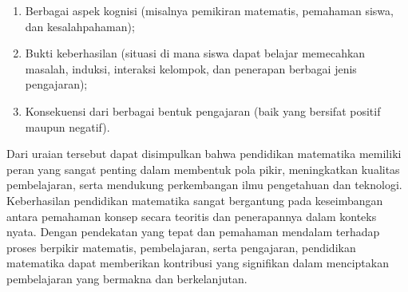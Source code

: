 \documentclass[12pt]{article}
\begin{document}
\begin{enumerate}
\begin{enumerate}
        \item Berbagai aspek kognisi (misalnya pemikiran matematis, pemahaman siswa, dan kesalahpahaman);
        \item Bukti keberhasilan (situasi di mana siswa dapat belajar memecahkan masalah, induksi, interaksi kelompok, dan penerapan berbagai jenis pengajaran);
        \item Konsekuensi dari berbagai bentuk pengajaran (baik yang bersifat positif maupun negatif).
    \end{enumerate}
    \hspace*{1cm}Dari uraian tersebut dapat disimpulkan bahwa pendidikan matematika memiliki peran yang sangat penting dalam membentuk pola pikir, meningkatkan kualitas pembelajaran, serta mendukung perkembangan ilmu pengetahuan dan teknologi. Keberhasilan pendidikan matematika sangat bergantung pada keseimbangan antara pemahaman konsep secara teoritis dan penerapannya dalam konteks nyata. Dengan pendekatan yang tepat dan pemahaman mendalam terhadap proses berpikir matematis, pembelajaran, serta pengajaran, pendidikan matematika dapat memberikan kontribusi yang signifikan dalam menciptakan pembelajaran yang bermakna dan berkelanjutan.


\end{enumerate}
\end{document}

